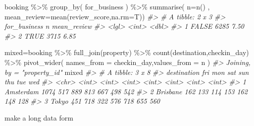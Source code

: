 \documentclass[
]{article}
\newenvironment{Shaded}{\begin{snugshade}}{\end{snugshade}}
\newcommand{\AttributeTok}[1]{\textcolor[rgb]{0.77,0.63,0.00}{#1}}
\newcommand{\CommentTok}[1]{\textcolor[rgb]{0.56,0.35,0.01}{\textit{#1}}}
\newcommand{\FunctionTok}[1]{\textcolor[rgb]{0.00,0.00,0.00}{#1}}
\newcommand{\NormalTok}[1]{#1}
\newcommand{\OtherTok}[1]{\textcolor[rgb]{0.56,0.35,0.01}{#1}}
\newcommand{\SpecialCharTok}[1]{\textcolor[rgb]{0.00,0.00,0.00}{#1}}
\begin{document}
\begin{Shaded}
\begin{Highlighting}[]
\NormalTok{booking }\SpecialCharTok{\%\textgreater{}\%} 
  \FunctionTok{group\_by}\NormalTok{(}
\NormalTok{    for\_business}
\NormalTok{  ) }\SpecialCharTok{\%\textgreater{}\%} 
  \FunctionTok{summarise}\NormalTok{(}
    \AttributeTok{n=}\FunctionTok{n}\NormalTok{()}
\NormalTok{    , }\AttributeTok{mean\_review=}\FunctionTok{mean}\NormalTok{(review\_score,}\AttributeTok{na.rm=}\NormalTok{T))}
\CommentTok{\#\textgreater{} \# A tibble: 2 x 3}
\CommentTok{\#\textgreater{}   for\_business     n mean\_review}
\CommentTok{\#\textgreater{}   \textless{}lgl\textgreater{}        \textless{}int\textgreater{}       \textless{}dbl\textgreater{}}
\CommentTok{\#\textgreater{} 1 FALSE         6285        7.50}
\CommentTok{\#\textgreater{} 2 TRUE          3715        6.85}

\NormalTok{mixed}\OtherTok{=}\NormalTok{booking }\SpecialCharTok{\%\textgreater{}\%} 
  \FunctionTok{full\_join}\NormalTok{(property) }\SpecialCharTok{\%\textgreater{}\%} 
  \FunctionTok{count}\NormalTok{(destination,checkin\_day) }\SpecialCharTok{\%\textgreater{}\%} 
  \FunctionTok{pivot\_wider}\NormalTok{(}
    \AttributeTok{names\_from =}\NormalTok{ checkin\_day,}\AttributeTok{values\_from =}\NormalTok{ n}
\NormalTok{  )}
\CommentTok{\#\textgreater{} Joining, by = "property\_id"}
\NormalTok{mixed }
\CommentTok{\#\textgreater{} \# A tibble: 3 x 8}
\CommentTok{\#\textgreater{}   destination   fri   mon   sat   sun   thu   tue   wed}
\CommentTok{\#\textgreater{}   \textless{}chr\textgreater{}       \textless{}int\textgreater{} \textless{}int\textgreater{} \textless{}int\textgreater{} \textless{}int\textgreater{} \textless{}int\textgreater{} \textless{}int\textgreater{} \textless{}int\textgreater{}}
\CommentTok{\#\textgreater{} 1 Amsterdam    1074   517   889   813   667   498   542}
\CommentTok{\#\textgreater{} 2 Brisbane      162   133   114   153   162   148   128}
\CommentTok{\#\textgreater{} 3 Tokyo         451   718   322   576   718   655   560}
\end{Highlighting}
\end{Shaded}

make a long data form
\end{document}
